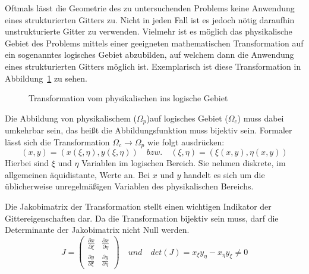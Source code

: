 Oftmals lässt die Geometrie des zu untersuchenden Problems keine Anwendung eines
strukturierten Gitters zu. Nicht in jeden Fall ist es jedoch nötig daraufhin unstrukturierte
Gitter zu verwenden. Vielmehr ist es möglich das physikalische Gebiet des Problems
mittels einer geeigneten mathematischen Transformation auf ein sogenanntes
logisches Gebiet abzubilden, auf welchem dann die Anwendung eines strukturierten Gitters
möglich ist. Exemplarisch ist diese Transformation in Abbildung~\ref{fig:transf} zu sehen.
\begin{figure}[ht]

\centering
\caption{Transformation vom physikalischen ins logische Gebiet}
\label{fig:transf}
\end{figure}
Die Abbildung von physikalischem ($\Omega_p$)auf logisches Gebiet ($\Omega_c$) muss dabei umkehrbar sein, das heißt
die Abbildungsfunktion muss bijektiv sein. Formaler lässt sich die Transformation
$\Omega_c \rightarrow \Omega_p$ wie folgt ausdrücken:
\begin{equation}
  (x,y) = (x(\xi, \eta), y(\xi, \eta)) \quad bzw. \quad (\xi,\eta) = (\xi(x, y), \eta(x,y))
\end{equation}
Hierbei sind $\xi$ und $\eta$ Variablen im logischen Bereich. Sie nehmen diskrete, im allgemeinen äquidistante,
Werte an. Bei $x$ und $y$ handelt es sich um die üblicherweise unregelmäßigen Variablen des physikalischen Bereichs.

Die Jakobimatrix der Transformation stellt einen wichtigen Indikator der Gittereigenschaften dar.
Da die Transformation bijektiv sein muss, darf die Determinante der Jakobimatrix nicht Null werden.
\begin{equation}
  J = 
  \begin{pmatrix}
    \frac{\partial x}{\partial \xi} & \frac{\partial x}{\partial \eta} \\
    \frac{\partial y}{\partial \xi} & \frac{\partial y}{\partial \eta}
  \end{pmatrix}
  \quad und \quad
  det (J) = x_{\xi}y_{\eta} - x_{\eta} y_{\xi} \neq 0
\end{equation}
